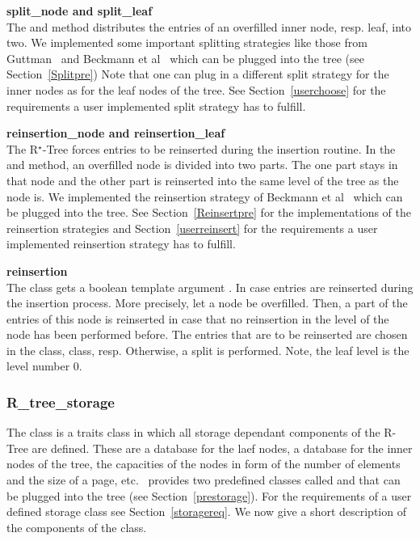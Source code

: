 \noindent
{\bf split\_node and split\_leaf}\\
\noindent
The  and  method distributes the
entries of an overfilled inner node, resp. leaf, into two.
We implemented some important splitting
strategies like those from Guttman~\cite{gutt-84} and Beckmann
et al~\cite{Beckmann:1990:RER} which can be plugged into the
tree (see Section~\ref{Splitpre})
Note that one can plug in a different split strategy for the
inner nodes as for the leaf nodes of the tree.
See Section~\ref{userchoose} for the 
requirements a user implemented split strategy has to fulfill.
\medskip

\noindent
{\bf reinsertion\_node and reinsertion\_leaf}\\
\noindent
The R$^\star$-Tree forces entries to be reinserted during the
insertion routine. 
In the  and  method,
an overfilled node is divided into two parts. The one part stays
in that node and the other part is reinserted into the same level 
of the tree as the node is.
We implemented the
 reinsertion
strategy of  Beckmann
et al~\cite{Beckmann:1990:RER} which can be plugged into the
tree. See Section~\ref{Reinsertpre} for the implementations of
the reinsertion strategies and  Section~\ref{userreinsert} for the
requirements a user implemented reinsertion strategy has to fulfill.
\medskip

\noindent
{\bf reinsertion}\\
\noindent
\label{reinsertion} 
The  class gets a boolean template
  argument . In case 
  entries are reinserted during the insertion process. More
  precisely, let a node be overfilled. Then, a part of the
  entries of this node is reinserted in case that no reinsertion 
  in the level of the node has been performed before. The entries 
  that are to be reinserted are chosen in the 
  class,  class, resp. Otherwise, a split is 
  performed. Note, the leaf level is the level number 0.

\subsubsection{R\_tree\_storage}
The  class  is a traits class in which all
storage dependant components of the R-Tree are defined. These are 
a database for the laef nodes, a database for the inner nodes of
the tree, the capacities of the nodes in form of the number of
elements and the size of a page, etc. \cgal\ provides two
predefined  classes called
 and 
that can be plugged into the tree (see
Section~\ref{prestorage}). For the requirements of a user defined 
storage class see Section~\ref{storagereq}.
We now give a short description of the components of the
 class. 
\medskip

